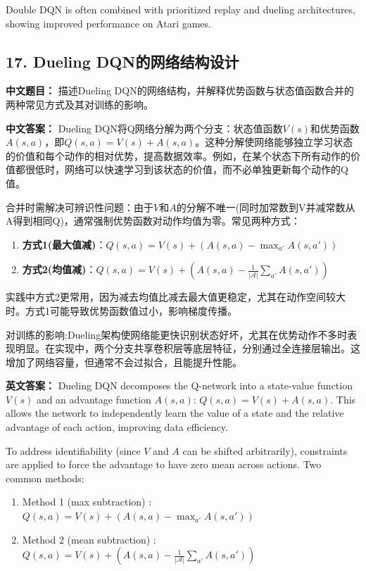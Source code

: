 \documentclass[10pt,a4paper]{ctexart}
\begin{document}
Double DQN is often combined with prioritized replay and dueling architectures, showing improved performance on Atari games.

\subsection*{17. Dueling DQN的网络结构设计}
\textbf{中文题目：} 描述Dueling DQN的网络结构，并解释优势函数与状态值函数合并的两种常见方式及其对训练的影响。

\textbf{中文答案：}  
Dueling DQN将Q网络分解为两个分支：状态值函数\(V(s)\)和优势函数\(A(s,a)\)，即\(Q(s,a) = V(s) + A(s,a)\)。这种分解使网络能够独立学习状态的价值和每个动作的相对优势，提高数据效率。例如，在某个状态下所有动作的价值都很低时，网络可以快速学习到该状态的价值，而不必单独更新每个动作的Q值。

合并时需解决可辨识性问题：由于\(V\)和\(A\)的分解不唯一(同时加常数到V并减常数从A得到相同Q)，通常强制优势函数对动作均值为零。常见两种方式：

\begin{enumerate}
    \item \textbf{方式1(最大值减)}：\(Q(s,a) = V(s) + (A(s,a) - \max_{a'} A(s,a'))\)
    \item \textbf{方式2(均值减)}：\(Q(s,a) = V(s) + (A(s,a) - \frac{1}{|\mathcal{A}|}\sum_{a'} A(s,a'))\)
\end{enumerate}

实践中方式2更常用，因为减去均值比减去最大值更稳定，尤其在动作空间较大时。方式1可能导致优势函数值过小，影响梯度传播。

 对训练的影响:Dueling架构使网络能更快识别状态好坏，尤其在优势动作不多时表现明显。在实现中，两个分支共享卷积层等底层特征，分别通过全连接层输出。这增加了网络容量，但通常不会过拟合，且能提升性能。

\textbf{英文答案：}  
Dueling DQN decomposes the Q-network into a state-value function \(V(s)\) and an advantage function \(A(s,a)\): \(Q(s,a) = V(s) + A(s,a)\). This allows the network to independently learn the value of a state and the relative advantage of each action, improving data efficiency.

To address identifiability (since \(V\) and \(A\) can be shifted arbitrarily), constraints are applied to force the advantage to have zero mean across actions. Two common methods:

\begin{enumerate}
    \item Method 1 (max subtraction) : \(Q(s,a) = V(s) + (A(s,a) - \max_{a'} A(s,a'))\)
    \item Method 2 (mean subtraction) : \(Q(s,a) = V(s) + (A(s,a) - \frac{1}{|\mathcal{A}|}\sum_{a'} A(s,a'))\)
\end{enumerate}
\end{document}
